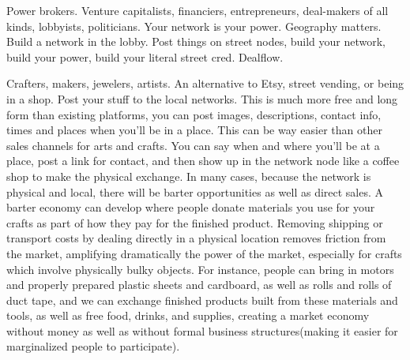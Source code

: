 Power brokers. Venture capitalists, financiers, entrepreneurs, deal-makers of all kinds, lobbyists, politicians.  Your network is your power.  Geography matters.  Build a network in the lobby.  Post things on street nodes, build your network, build your power, build your literal street cred. Dealflow.  

Crafters, makers, jewelers, artists.  An alternative to Etsy, street vending, or being in a shop.  Post your stuff to the local networks.  This is much more free and long form than existing platforms, you can post images, descriptions, contact info, times and places when you'll be in a place.  This can be way easier than other sales channels for arts and crafts.  You can say when and where you'll be at a place, post a link for contact, and then show up in the network node like a coffee shop to make the physical exchange.  In many cases, because the network is physical and local, there will be barter opportunities as well as direct sales.  A barter economy can develop where people donate materials you use for your crafts as part of how they pay for the finished product.  Removing shipping or transport costs by dealing directly in a physical location removes friction from the market, amplifying dramatically the power of the market, especially for crafts which involve physically bulky objects.  For instance, people can bring in motors and properly prepared plastic sheets and cardboard, as well as rolls and rolls of duct tape, and we can exchange finished products built from these materials and tools, as well as free food, drinks, and supplies, creating a market economy without money as well as without formal business structures(making it easier for marginalized people to participate).

